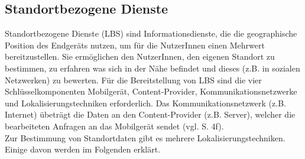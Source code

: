 \subsection{Standortbezogene Dienste}
Standortbezogene Dienste (\gls{LBS}) sind Informationsdienste, die die geographische Position des Endgeräts nutzen, um für die NutzerInnen einen Mehrwert bereitzustellen. Sie ermöglichen den NutzerInnen, den eigenen Standort zu bestimmen, zu erfahren was sich in der Nähe befindet und dieses (z.B. in sozialen Netzwerken) zu bewerten. Für die Bereitstellung von \gls{LBS} sind die vier Schlüsselkomponenten Mobilgerät, Content-Provider, Kommunikationsnetzwerke und Lokalisierungstechniken erforderlich. Das Kommunikationsnetzwerk (z.B. Internet) übeträgt die Daten an den Content-Provider (z.B. Server), welcher die bearbeiteten Anfragen an das Mobilgerät sendet (vgl. \cite{gps} S. 4f).\\
Zur Bestimmung von Standortdaten gibt es mehrere Lokalisierungstechniken. Einige davon werden im Folgenden erklärt.
%
%
